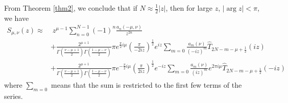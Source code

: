 \documentclass[a4paper,twoside,10pt]{amsart}
\numberwithin{equation}{section}
\begin{document}
From Theorem \ref{thm2}, we conclude that if $N \approx \frac{1}{2}\left| z \right|$, then for large $z$, $ \left|\arg z\right| < \pi$, we have
\begin{align*}
S_{\mu ,\nu } \left( z \right) \approx & \; z^{\mu  - 1} \sum\limits_{n = 0}^{N-1}  {\left( { - 1} \right)^n \frac{{a_n \left( { - \mu ,\nu } \right)}}{{z^{2n} }}} \\ & + \frac{{2^{\mu  + 1} }}{{\Gamma \left( {\frac{{\nu  - \mu  + 1}}{2}} \right)\Gamma \left( {\frac{{1 - \mu  - \nu }}{2}} \right)}}\pi e^{\frac{\pi }{2}i\mu } \left( {\frac{\pi }{{ - 2iz}}} \right)^{\frac{1}{2}} e^{iz} \sum\limits_{m = 0} {\frac{{a_m \left( \nu  \right)}}{{\left( { - iz} \right)^m }}\widehat T_{2N - m - \mu  + \frac{1}{2}} \left( {iz} \right)} 
\\ & + \frac{{2^{\mu  + 1} }}{{\Gamma \left( {\frac{{\nu  - \mu  + 1}}{2}} \right)\Gamma \left( {\frac{{1 - \mu  - \nu }}{2}} \right)}}\pi e^{ - \frac{\pi }{2}i\mu } \left( {\frac{\pi }{{2iz}}} \right)^{\frac{1}{2}} e^{ - iz} \sum\limits_{m = 0} {\frac{{a_m \left( \nu  \right)}}{{\left( {iz} \right)^m }}e^{2\pi i\mu } \widehat T_{2N - m - \mu  + \frac{1}{2}} \left( { - iz} \right)} 
\end{align*}
where $\sum\nolimits_{m = 0}$ means that the sum is restricted to the first few terms of the series.
\end{document}
